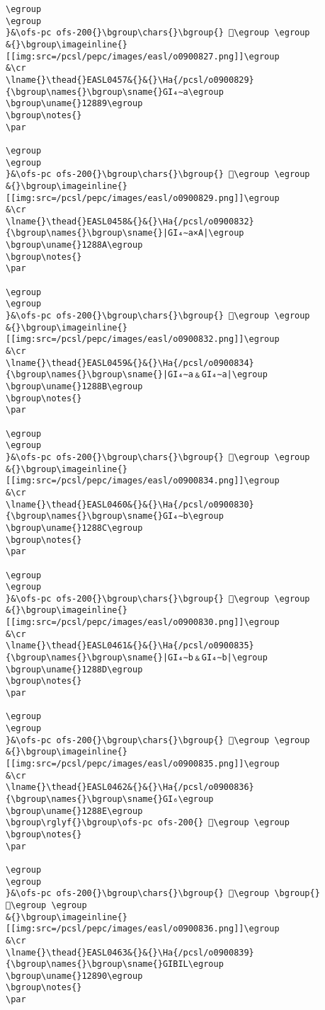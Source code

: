 \begin{verbatim}
\egroup
\egroup
}&\ofs-pc ofs-200{}\bgroup\chars{}\bgroup{} 𒢃\egroup \egroup
&{}\bgroup\imageinline{}[[img:src=/pcsl/pepc/images/easl/o0900827.png]]\egroup
&\cr
\lname{}\thead{}EASL0457&{}&{}\Ha{/pcsl/o0900829}{\bgroup\names{}\bgroup\sname{}GI₄∼a\egroup
\bgroup\uname{}12889\egroup
\bgroup\notes{}
\par 

\egroup
\egroup
}&\ofs-pc ofs-200{}\bgroup\chars{}\bgroup{} 𒢉\egroup \egroup
&{}\bgroup\imageinline{}[[img:src=/pcsl/pepc/images/easl/o0900829.png]]\egroup
&\cr
\lname{}\thead{}EASL0458&{}&{}\Ha{/pcsl/o0900832}{\bgroup\names{}\bgroup\sname{}|GI₄∼a×A|\egroup
\bgroup\uname{}1288A\egroup
\bgroup\notes{}
\par 

\egroup
\egroup
}&\ofs-pc ofs-200{}\bgroup\chars{}\bgroup{} 𒢊\egroup \egroup
&{}\bgroup\imageinline{}[[img:src=/pcsl/pepc/images/easl/o0900832.png]]\egroup
&\cr
\lname{}\thead{}EASL0459&{}&{}\Ha{/pcsl/o0900834}{\bgroup\names{}\bgroup\sname{}|GI₄∼a﹠GI₄∼a|\egroup
\bgroup\uname{}1288B\egroup
\bgroup\notes{}
\par 

\egroup
\egroup
}&\ofs-pc ofs-200{}\bgroup\chars{}\bgroup{} 𒢋\egroup \egroup
&{}\bgroup\imageinline{}[[img:src=/pcsl/pepc/images/easl/o0900834.png]]\egroup
&\cr
\lname{}\thead{}EASL0460&{}&{}\Ha{/pcsl/o0900830}{\bgroup\names{}\bgroup\sname{}GI₄∼b\egroup
\bgroup\uname{}1288C\egroup
\bgroup\notes{}
\par 

\egroup
\egroup
}&\ofs-pc ofs-200{}\bgroup\chars{}\bgroup{} 𒢌\egroup \egroup
&{}\bgroup\imageinline{}[[img:src=/pcsl/pepc/images/easl/o0900830.png]]\egroup
&\cr
\lname{}\thead{}EASL0461&{}&{}\Ha{/pcsl/o0900835}{\bgroup\names{}\bgroup\sname{}|GI₄∼b﹠GI₄∼b|\egroup
\bgroup\uname{}1288D\egroup
\bgroup\notes{}
\par 

\egroup
\egroup
}&\ofs-pc ofs-200{}\bgroup\chars{}\bgroup{} 𒢍\egroup \egroup
&{}\bgroup\imageinline{}[[img:src=/pcsl/pepc/images/easl/o0900835.png]]\egroup
&\cr
\lname{}\thead{}EASL0462&{}&{}\Ha{/pcsl/o0900836}{\bgroup\names{}\bgroup\sname{}GI₆\egroup
\bgroup\uname{}1288E\egroup
\bgroup\rglyf{}\bgroup\ofs-pc ofs-200{} 𒢎\egroup \egroup
\bgroup\notes{}
\par 

\egroup
\egroup
}&\ofs-pc ofs-200{}\bgroup\chars{}\bgroup{} 𒢏\egroup \bgroup{} 𒢎\egroup \egroup
&{}\bgroup\imageinline{}[[img:src=/pcsl/pepc/images/easl/o0900836.png]]\egroup
&\cr
\lname{}\thead{}EASL0463&{}&{}\Ha{/pcsl/o0900839}{\bgroup\names{}\bgroup\sname{}GIBIL\egroup
\bgroup\uname{}12890\egroup
\bgroup\notes{}
\par 


\end{verbatim}
